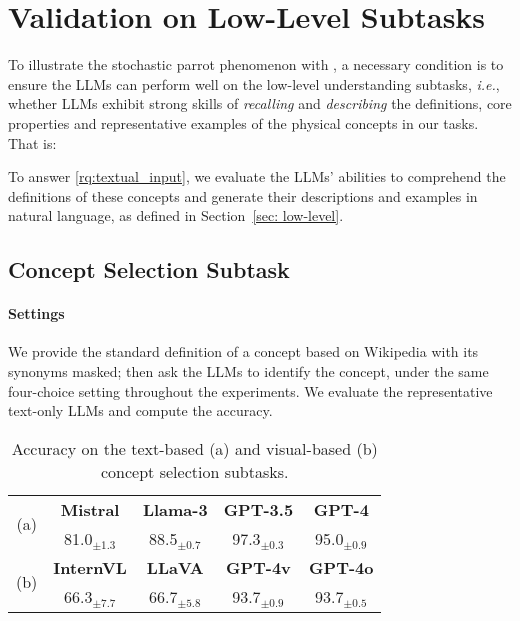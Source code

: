 \section{Validation on Low-Level Subtasks}


To illustrate the stochastic parrot phenomenon with \datasetnamens, a necessary condition is to ensure the LLMs can perform well on the low-level understanding subtasks, \emph{i.e.}, whether LLMs exhibit strong skills of \emph{recalling} and \emph{describing} the definitions, core properties and representative examples of the physical concepts in our tasks. That is:



\label{rq:textual_input}

To answer \ref{rq:textual_input}, we evaluate the LLMs' abilities to comprehend the definitions of these concepts and generate their descriptions and examples in natural language, as defined in Section~\ref{sec: low-level}.

\subsection{Concept Selection Subtask}
\paragraph{Settings} 
We provide the standard definition of a concept based on Wikipedia with its synonyms masked; then ask the LLMs to identify the concept, under the same four-choice setting throughout the experiments.
We evaluate the representative text-only LLMs and compute the accuracy. 

\begin{table}[t!]
    \small
    \centering
    \begin{tabular}{ccccc}
    \toprule
    \multirow{2}{*}{(a)}& \bf Mistral & \bf Llama-3 & \bf GPT-3.5 & \bf GPT-4 \\
     \cmidrule{2-5}
    & 81.0$_{\pm\text{1.3}}$& 88.5$_{\pm\text{0.7}}$& 97.3$_{\pm\text{0.3}}$ & 95.0$_{\pm\text{0.9}}$\\
    \bottomrule
    \toprule
    \multirow{2}{*}{(b)}& \bf InternVL & \bf LLaVA & \bf GPT-4v & \bf GPT-4o \\
     \cmidrule{2-5}
    & 66.3$_{\pm\text{7.7}}$ & 66.7$_{\pm\text{5.8}}$ & 93.7$_{\pm\text{0.9}}$ &93.7$_{\pm\text{0.5}}$\\
    \bottomrule
    \end{tabular}
    \vspace{-0.1in}
    \caption{Accuracy on the text-based (a) and visual-based (b) concept selection subtasks.}
    \label{tab:selection}
    \vspace{-0.2in}
\end{table}
